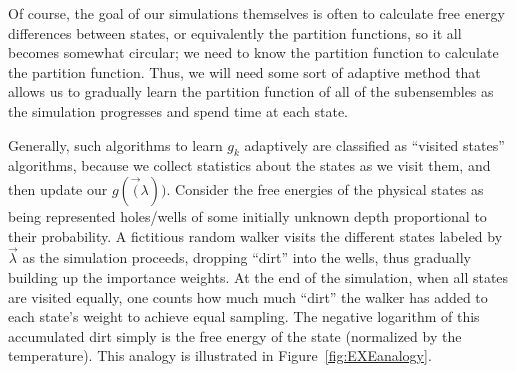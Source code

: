 \documentclass[superscriptaddress,showkeys, nofootinbib, pre, aps]{revtex4-1}
\begin{document}
Of course, the goal of our simulations themselves is often to calculate free energy differences between states, or equivalently the partition functions, so it all becomes somewhat circular; we need to know the partition function to calculate the partition function. Thus, we will need some sort of adaptive method that allows us to gradually learn the partition function of all of the subensembles as the simulation progresses and spend time at each state.

Generally, such algorithms to learn $g_k$ adaptively are classified as ``visited states'' algorithms, because we collect statistics about the states as we visit them, and then update our $g(\vec(\lambda))$. Consider the free energies of the physical states as being represented holes/wells of some initially unknown depth proportional to their probability.  A
fictitious random walker visits the different states labeled by $\vec{\lambda}$ as the simulation proceeds, dropping ``dirt'' into the
wells, thus gradually building up the importance weights.  At the end
of the simulation, when all states are visited equally, one counts how
much much ``dirt'' the walker has added to each state's weight to
achieve equal sampling. The negative logarithm of this accumulated dirt simply is the free energy of the state (normalized by the temperature).  This analogy is illustrated in
Figure~\ref{fig:EXEanalogy}.
\end{document}
